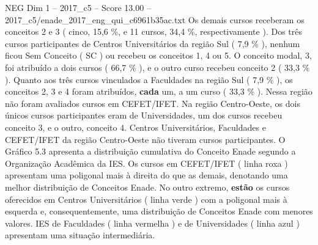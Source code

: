 \begin{textsample}{NEG Dim 1 – 2017\_c5 – Score 13.00 – 2017\_c5/enade\_2017\_eng\_qui\_c6961b35ac.txt}
Os demais cursos receberam os conceitos 2 e 3 ( cinco, 15,6 \%, e 11 cursos, 34,4 \%, respectivamente ).
Dos três cursos participantes de Centros Universitários da região Sul ( 7,9 \% ), nenhum ficou Sem Conceito ( SC ) ou recebeu os conceitos 1, 4 ou 5.
O conceito modal, 3, foi atribuído a dois cursos ( 66,7 \% ), e o outro curso recebeu conceito 2 ( 33,3 \% ).
Quanto aos três cursos vinculados a Faculdades na região Sul ( 7,9 \% ), os conceitos 2, 3 e 4 foram atribuídos, \textbf{cada} um, a um curso ( 33,3 \% ).
Nessa região não foram avaliados cursos em CEFET/IFET.
Na região Centro-Oeste, os dois únicos cursos participantes eram de Universidades, um dos cursos recebeu conceito 3, e o outro, conceito 4.
Centros Universitários, Faculdades e CEFET/IFET da região Centro-Oeste não tiveram cursos participantes.
O Gráfico 5.3 apresenta a distribuição cumulativa do Conceito Enade segundo a Organização Acadêmica da IES.
Os cursos em CEFET/IFET ( linha roxa ) apresentam uma poligonal mais à direita do que as demais, denotando uma melhor distribuição de Conceitos Enade.
No outro extremo, \textbf{estão} os cursos oferecidos em Centros Universitários ( linha verde ) com a poligonal mais à esquerda e, consequentemente, uma distribuição de Conceitos Enade com menores valores.
IES de Faculdades ( linha vermelha ) e de Universidades ( linha azul ) apresentam uma situação intermediária.

\end{textsample}
